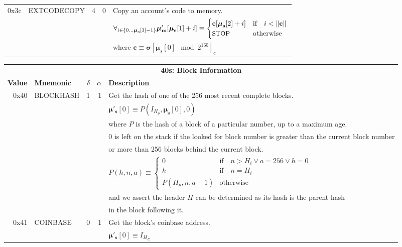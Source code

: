 \documentclass[9pt,oneside]{amsart}
\begin{document}
\begin{tabular*}{\columnwidth}[h]{rlrrl}
0x3c & {\small EXTCODECOPY} & 4 & 0 & Copy an account's code to memory. \\
&&&& $\forall_{i \in \{ 0 \dots \boldsymbol{\mu}_\mathbf{s}[3] - 1\} } \boldsymbol{\mu}'_\mathbf{m}[\boldsymbol{\mu}_\mathbf{s}[1] + i ] \equiv
\begin{cases} \mathbf{c}[\boldsymbol{\mu}_\mathbf{s}[2] + i] & \text{if} \quad i < \lVert \mathbf{c} \rVert \\ \text{\small STOP} & \text{otherwise} \end{cases}$\\
&&&& where $\mathbf{c} \equiv \boldsymbol{\sigma}[\boldsymbol{\mu}_s[0] \mod 2^{160}]_c$ \\
\bottomrule
\end{tabular*}

\begin{tabular*}{\columnwidth}[h]{rlrrl}
\toprule
\multicolumn{5}{c}{\textbf{40s: Block Information}} \vspace{5pt} \\
\textbf{Value} & \textbf{Mnemonic} & $\delta$ & $\alpha$ & \textbf{Description} \vspace{5pt} \\
0x40 & {\small BLOCKHASH} & 1 & 1 & Get the hash of one of the 256 most recent complete blocks. \\
&&&& $\boldsymbol{\mu}'_\mathbf{s}[0] \equiv P(I_{H_p}, \boldsymbol{\mu}_\mathbf{s}[0], 0)$ \\
&&&& where $P$ is the hash of a block of a particular number, up to a maximum age.\\
&&&& 0 is left on the stack if the looked for block number is greater than the current block number \\
&&&& or more than 256 blocks behind the current block. \\
&&&& $P(h, n, a) \equiv \begin{cases} 0 & \text{if} \quad n > H_i \vee a = 256 \vee h = 0 \\ h & \text{if} \quad n = H_i \\ P(H_p, n, a + 1) & \text{otherwise} \end{cases}$ \\
&&&& and we assert the header $H$ can be determined as its hash is the parent hash \\
&&&& in the block following it. \\
\midrule
0x41 & {\small COINBASE} & 0 & 1 & Get the block's coinbase address. \\
&&&& $\boldsymbol{\mu}'_\mathbf{s}[0] \equiv {I_H}_c$ \\

\end{tabular*}
\end{document}
